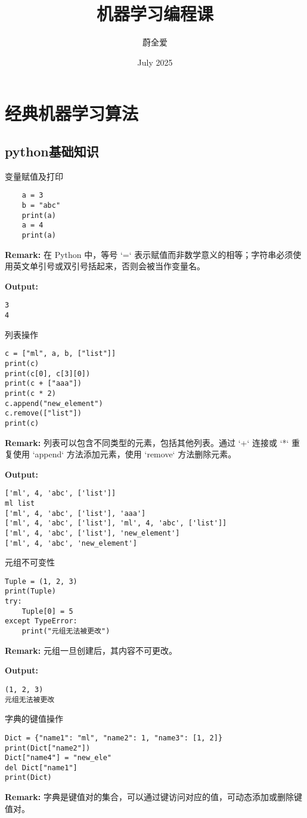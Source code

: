 \documentclass{article}
\title{机器学习编程课}
\author{蔚全爱}
\date{July 2025}
\begin{document}
\maketitle

\section{经典机器学习算法}

\subsection{python基础知识}

变量赋值及打印

\begin{lstlisting}
    a = 3
    b = "abc"
    print(a)
    a = 4
    print(a)
\end{lstlisting}
\textbf{Remark:} 在 Python 中，等号 `=` 表示赋值而非数学意义的相等；字符串必须使用英文单引号或双引号括起来，否则会被当作变量名。

\noindent\textbf{Output:}
\begin{verbatim}
3
4
\end{verbatim}
\par
列表操作
\begin{lstlisting}
c = ["ml", a, b, ["list"]]
print(c)
print(c[0], c[3][0])
print(c + ["aaa"])
print(c * 2)
c.append("new_element")
c.remove(["list"])
print(c)
\end{lstlisting}
\textbf{Remark:} 列表可以包含不同类型的元素，包括其他列表。通过 `+` 连接或 `*` 重复使用 `append` 方法添加元素，使用 `remove` 方法删除元素。

\textbf{Output:}
\begin{verbatim}
['ml', 4, 'abc', ['list']]
ml list
['ml', 4, 'abc', ['list'], 'aaa']
['ml', 4, 'abc', ['list'], 'ml', 4, 'abc', ['list']]
['ml', 4, 'abc', ['list'], 'new_element']
['ml', 4, 'abc', 'new_element']
\end{verbatim}

元组不可变性
\begin{lstlisting}
Tuple = (1, 2, 3)
print(Tuple)
try:
    Tuple[0] = 5
except TypeError:
    print("元组无法被更改")
\end{lstlisting}
\textbf{Remark:} 元组一旦创建后，其内容不可更改。

\textbf{Output:}
\begin{verbatim}
(1, 2, 3)
元组无法被更改
\end{verbatim}

字典的键值操作
\begin{lstlisting}
Dict = {"name1": "ml", "name2": 1, "name3": [1, 2]}
print(Dict["name2"])
Dict["name4"] = "new_ele"
del Dict["name1"]
print(Dict)
\end{lstlisting}
\textbf{Remark:} 字典是键值对的集合，可以通过键访问对应的值，可动态添加或删除键值对。
\end{document}
